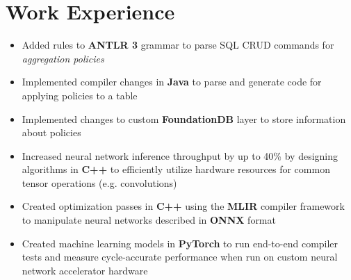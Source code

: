 \documentclass{moderncv}
\begin{document}
\makecvtitle
\section{Work Experience}
{\begin{itemize}
    \item Added rules to \textbf{ANTLR 3} grammar to parse SQL CRUD commands for \textit{aggregation policies}
    \item Implemented compiler changes in \textbf{Java} to parse and generate code for applying policies to a table
    \item Implemented changes to custom \textbf{FoundationDB} layer to store information about policies
\end{itemize}}

\begin{comment}
Snowflake1: Aggregation Policy Parser Stuff
basically, added a new type of policy which is an SQL object
it had to be added to the parser through an ANTLR grammar
but there was an issue with the way the grammar was factored into sub-grammars
so I had to inspect generated code and eventually refactor the root rules
into subrules in separate files
    rootparser.g:
        rule -> rule1 | rule2 | rule3;
    rules1.g:
        rule1 -> [...]
        rule2 -> [...]
    rules2.g:
        rule3 -> [...]
became
    rootparser.g:
        rule -> rules1 | rules2
    rules1.g:
        rules1 -> rule1 | rule2
        rule1 -> [...]
        rule2 -> [...]
    rules2.g:
        rule3 -> [...]
and then i was able to implement the rules for that type of policy
\end{comment}

{\begin{itemize}
    \item Increased neural network inference throughput by up to 40\% by designing algorithms in \textbf{C++} to efficiently utilize hardware resources for common tensor operations (e.g. convolutions)
    \item Created optimization passes in \textbf{C++} using the \textbf{MLIR} compiler framework to manipulate neural networks described in \textbf{ONNX} format
    \item Created machine learning models in \textbf{PyTorch} to run end-to-end compiler tests and measure cycle-accurate performance when run on custom neural network accelerator hardware
\end{itemize}}
\end{document}
